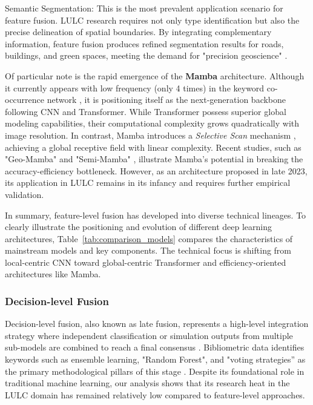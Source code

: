 \documentclass[]{interact}
\theoremstyle{plain}%
\theoremstyle{definition}
\theoremstyle{remark}
\begin{document}
\medskip
Semantic Segmentation: This is the most prevalent application scenario for feature fusion. LULC research requires not only type identification but also the precise delineation of spatial boundaries. By integrating complementary information, feature fusion produces refined segmentation results for roads, buildings, and green spaces, meeting the demand for "precision geoscience" \citep{45, 48}.

Of particular note is the rapid emergence of the \textbf{Mamba} architecture. Although it currently appears with low frequency (only 4 times) in the keyword co-occurrence network \citep{49, 5, 51,52}, it is positioning itself as the next-generation backbone following CNN and Transformer. While Transformer possess superior global modeling capabilities, their computational complexity grows quadratically with image resolution. In contrast, Mamba introduces a \textit{Selective Scan} mechanism \citep{53}, achieving a global receptive field with linear complexity. Recent studies, such as "Geo-Mamba" \citep{49} and "Semi-Mamba" \citep{51}, illustrate Mamba's potential in breaking the accuracy-efficiency bottleneck. However, as an architecture proposed in late 2023, its application in LULC remains in its infancy and requires further empirical validation.

In summary, feature-level fusion has developed into diverse technical lineages. To clearly illustrate the positioning and evolution of different deep learning architectures, Table~\ref{tab:comparison_models} compares the characteristics of mainstream models and key components. The technical focus is shifting from local-centric CNN toward global-centric Transformer and efficiency-oriented architectures like Mamba.



\subsubsection{Decision-level Fusion}
Decision-level fusion, also known as late fusion, represents a high-level integration strategy where independent classification or simulation outputs from multiple sub-models are combined to reach a final consensus \citep{Pu2023DecisionFusion}. Bibliometric data identifies keywords such as ensemble learning, "Random Forest", and "voting strategies” as the primary methodological pillars of this stage \citep{55}. Despite its foundational role in traditional machine learning, our analysis shows that its research heat in the LULC domain has remained relatively low compared to feature-level approaches.
\end{document}
